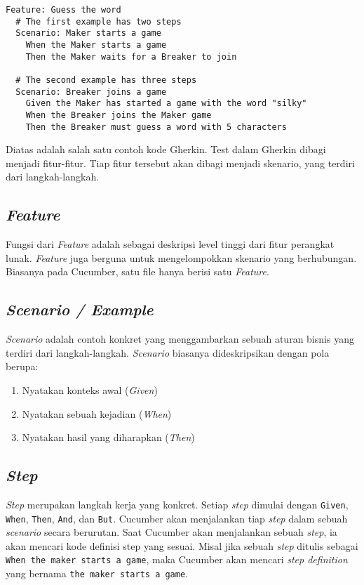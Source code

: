 \begin{lstlisting}[language=Gherkin]
Feature: Guess the word
  # The first example has two steps
  Scenario: Maker starts a game
    When the Maker starts a game
    Then the Maker waits for a Breaker to join

  # The second example has three steps
  Scenario: Breaker joins a game
    Given the Maker has started a game with the word "silky"
    When the Breaker joins the Maker game
    Then the Breaker must guess a word with 5 characters
\end{lstlisting}

Diatas adalah salah satu contoh kode Gherkin.
Test dalam Gherkin dibagi menjadi fitur-fitur. Tiap fitur tersebut akan dibagi menjadi
skenario, yang terdiri dari langkah-langkah.

\subsection{\emph{Feature}}

Fungsi dari \emph{Feature} adalah sebagai deskripsi level tinggi dari fitur perangkat lunak.
\emph{Feature} juga berguna untuk mengelompokkan skenario yang berhubungan.
Biasanya pada Cucumber, satu file hanya berisi satu \emph{Feature}.

\subsection{\emph{Scenario / Example}}

\emph{Scenario} adalah contoh konkret yang menggambarkan sebuah aturan bisnis yang terdiri
dari langkah-langkah. \emph{Scenario} biasanya dideskripsikan dengan pola berupa:

\begin{enumerate}
    \item Nyatakan konteks awal (\emph{Given})
    \item Nyatakan sebuah kejadian (\emph{When})
    \item Nyatakan hasil yang diharapkan (\emph{Then})
\end{enumerate}

\subsection{\emph{Step}}

\emph{Step} merupakan langkah kerja yang konkret.
Setiap \emph{step} dimulai dengan \texttt{Given}, \texttt{When}, \texttt{Then},
\texttt{And}, dan \texttt{But}.
Cucumber akan menjalankan tiap \emph{step} dalam sebuah \emph{scenario} secara berurutan.
Saat Cucumber akan menjalankan sebuah \emph{step}, ia akan mencari kode definisi step yang sesuai.
Misal jika sebuah \emph{step} ditulis sebagai \texttt{When the maker starts a game},
maka Cucumber akan mencari \emph{step definition} yang bernama
\texttt{the maker starts a game}.

